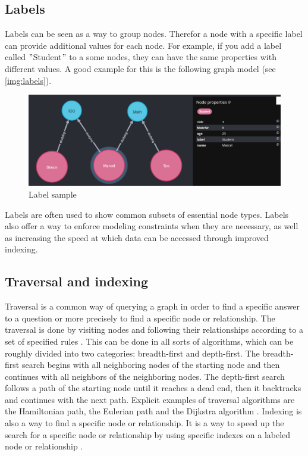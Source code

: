 \subsection{Labels} \label{subsec:labels}
Labels can be seen as a way to group nodes.
Therefor a node with a specific label can provide additional values for each node.
For example, if you add a label called \("\)Student\("\) to a some nodes, they can have the same properties with different values.
A good example for this is the following graph model (see \autoref{img:labels}).
\begin{figure}[!h]
    \centering
    \includegraphics[width=1 \linewidth]{images/labels.png}
    \caption{Label sample} \label{img:labels}
\end{figure}
Labels are often used to show common subsets of essential node types.
Labels also offer a way to enforce modeling constraints when they are necessary, as well as increasing the speed at which data
can be accessed through improved indexing. \parencite[compare P. 6f.]{PractivalNeo4j}

\subsection{Traversal and indexing}\label{subsec:traversal-and-indexing}
Traversal is a common way of querying a graph in order to find a specific answer to a question or more precisely to find a
specific node or relationship.
The traversal is done by visiting nodes and following their relationships according to a set of specified rules \parencite[compare P.7]{PractivalNeo4j}.
This can be done in all sorts of algorithms, which can be roughly divided into two categories: breadth-first and depth-first.
The breadth-first  search begins with all neighboring nodes of the starting node and then continues with all neighbors of the neighboring nodes.
The depth-first search follows a path of the starting node until it reaches a dead end, then it backtracks and continues with the next path.
Explicit examples of traversal algorithms are the Hamiltonian path, the Eulerian path and the Dijkstra algorithm \parencite[compare]{juypiter:Graph}.
Indexing is also a way to find a specific node or relationship.
It is a way to speed up the search for a specific node or relationship by using specific indexes on a labeled node or relationship \parencite[compare P.7]{PractivalNeo4j}.